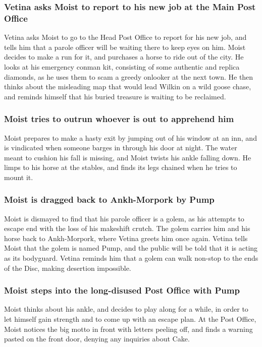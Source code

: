 \subsubsection{\Gls{Vetina} asks \Gls{Moist} to report to his new job at the Main Post Office}
\Gls{Vetina} asks \Gls{Moist} to go to the Head Post Office to report for his new job, and tells him
that a parole officer will be waiting there to keep eyes on him. \Gls{Moist} decides to make a run
for it, and purchases a horse to ride out of the city. He looks at his emergency conman kit,
consisting of some authentic and replica diamonds, as he uses them to scam a greedy onlooker at the
next town. He then thinks about the misleading map that would lead \Gls{Wilkin} on a wild goose
chase, and reminds himself that his buried treasure is waiting to be reclaimed.

\subsubsection{\Gls{Moist} tries to outrun whoever is out to apprehend him}
\Gls{Moist} prepares to make a hasty exit by jumping out of his window at an inn, and is vindicated
when someone barges in through his door at night. The water meant to cushion his fall is missing,
and \Gls{Moist} twists his ankle falling down. He limps to his horse at the stables, and finds its
legs chained when he tries to mount it.

\subsubsection{\Gls{Moist} is dragged back to Ankh-Morpork by \Gls{Pump}}
\Gls{Moist} is dismayed to find that his parole officer is a golem, as his attempts to escape end
with the loss of his makeshift crutch. The golem carries him and his horse back to Ankh-Morpork,
where \Gls{Vetina} greets him once again. \Gls{Vetina} tells \Gls{Moist} that the golem is named
\Gls{Pump}, and the public will be told that it is acting as its bodyguard. \Gls{Vetina} reminds
him that a golem can walk non-stop to the ends of the Disc, making desertion impossible.

\subsubsection{\Gls{Moist} steps into the long-disused Post Office with \Gls{Pump}}
\Gls{Moist} thinks about his ankle, and decides to play along for a while, in order to let himself
gain strength and to come up with an escape plan. At the Post Office, \Gls{Moist} notices the
big motto in front with letters peeling off, and finds a warning pasted on the front door,
denying any inquiries about \Gls{Cake}.

